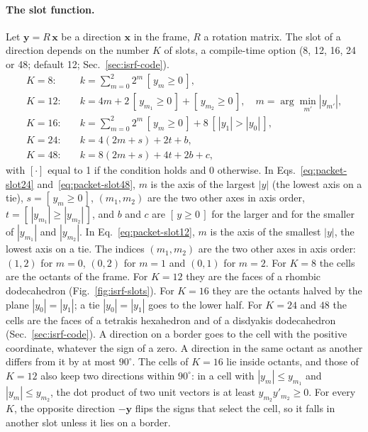 \paragraph{The slot function.} Let $\boldsymbol{y}=R\,\boldsymbol{x}$ be a
direction $\boldsymbol{x}$ in the frame, $R$ a rotation matrix. The slot of
a direction depends on the number $K$ of slots, a compile-time option
(8, 12, 16, 24 or 48; default 12; Sec.~\ref{sec:isrf-code}).
\begin{align}
  K=8:&\quad k=\sum_{m=0}^{2} 2^m\,[\,y_m\ge 0\,], \label{eq:packet-slot8}\\
  K=12:&\quad k=4m+2\,[\,y_{m_1}\ge0\,]+[\,y_{m_2}\ge0\,], \quad
  m=\arg\min_{m'} |y_{m'}|, \label{eq:packet-slot12}\\
  K=16:&\quad k=\sum_{m=0}^{2} 2^m\,[\,y_m\ge 0\,]+8\,[\,|y_1|>|y_0|\,],
  \label{eq:packet-slot16}\\
  K=24:&\quad k=4(2m+s)+2t+b, \label{eq:packet-slot24}\\
  K=48:&\quad k=8(2m+s)+4t+2b+c, \label{eq:packet-slot48}
\end{align}
with $[\cdot]$ equal to 1 if the condition holds and 0 otherwise. In
Eqs.~\eqref{eq:packet-slot24} and~\eqref{eq:packet-slot48}, $m$ is the axis of
the largest $|y|$ (the lowest axis on a tie), $s=[\,y_m\ge0\,]$, $(m_1,m_2)$
are the two other axes in axis order, $t=[\,|y_{m_1}|\ge|y_{m_2}|\,]$, and $b$
and $c$ are $[\,y\ge0\,]$ for the larger and for the smaller of $|y_{m_1}|$ and
$|y_{m_2}|$. In
Eq.~\eqref{eq:packet-slot12}, $m$ is the axis of the smallest $|y|$, the
lowest axis on a tie. The indices $(m_1,m_2)$ are the two other axes in axis
order: $(1,2)$ for $m=0$, $(0,2)$ for $m=1$ and $(0,1)$ for $m=2$. For $K=8$
the cells are the octants of the frame. For $K=12$ they are the faces of a
rhombic dodecahedron (Fig.~\ref{fig:isrf-slots}). For $K=16$ they are the octants halved by the plane
$|y_0|=|y_1|$; a tie $|y_0|=|y_1|$ goes to the lower half. For $K=24$ and $48$
the cells are the faces of a tetrakis hexahedron and of a disdyakis
dodecahedron (Sec.~\ref{sec:isrf-code}). A direction on a
border goes to the cell with the positive coordinate, whatever the sign of a
zero. A direction in the same octant as another differs from it by at most
$90^\circ$. The cells of $K=16$ lie inside octants, and those of $K=12$ also
keep two directions within $90^\circ$: in a cell with $|y_m|\le y_{m_1}$ and
$|y_m|\le y_{m_2}$, the dot product of two unit vectors is at least
$y_{m_2}y'_{m_2}\ge0$. For every $K$, the opposite direction $-\boldsymbol y$
flips the signs that select the cell, so it falls in another slot unless it
lies on a border.

